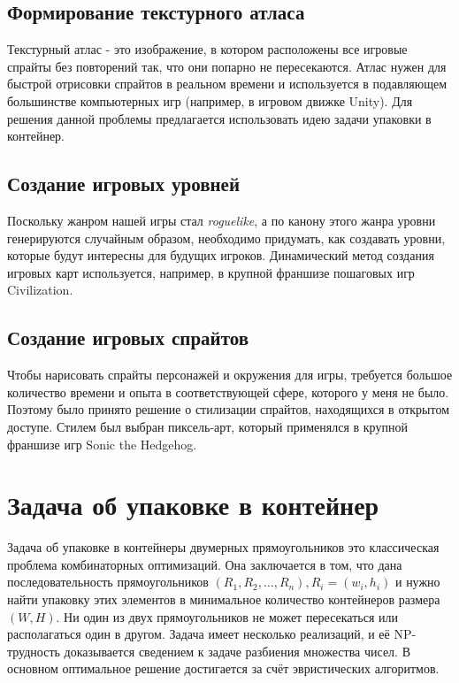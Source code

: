 \documentclass[a4paper,12pt]{report}
\theoremstyle{remark}
\begin{document}
\section{Формирование текстурного атласа}

Текстурный атлас - это изображение, в котором расположены все игровые спрайты без повторений так, что они попарно не пересекаются. Атлас нужен для быстрой отрисовки спрайтов в реальном времени и используется в подавляющем большинстве компьютерных игр (например, в игровом движке Unity\citep{unity}). Для решения данной проблемы предлагается использовать идею задачи упаковки в контейнер.

\section{Создание игровых уровней}

Поскольку жанром нашей игры стал \textit{roguelike}, а по канону этого жанра уровни генерируются случайным образом, необходимо придумать, как создавать уровни, которые будут интересны для будущих игроков. Динамический метод создания игровых карт используется, например, в крупной франшизе пошаговых игр Civilization\citep{civi}.

\section{Создание игровых спрайтов}

Чтобы нарисовать спрайты персонажей и окружения для игры, требуется большое количество времени и опыта в соответствующей сфере, которого у меня не было. Поэтому было принято решение о стилизации спрайтов, находящихся в открытом доступе. Стилем был выбран пиксель-арт, который применялся в крупной франшизе игр Sonic the Hedgehog\citep{sonic}.

\chapter{Задача об упаковке в контейнер} 

\parindent=1cm
Задача об упаковке в контейнеры\citep{Jylanki} двумерных прямоугольников это классическая проблема комбинаторных оптимизаций. Она заключается в том, что дана последовательность прямоугольников $(R_1, R_2, …, R_n), R_i = (w_i, h_i)$ и нужно найти упаковку этих элементов в минимальное количество контейнеров размера $(W, H)$. Ни один из двух прямоугольников не может пересекаться или располагаться один в другом. Задача имеет несколько реализаций, и её NP-трудность доказывается сведением к задаче разбиения множества чисел. В основном оптимальное решение достигается за счёт эвристических алгоритмов.
\end{document}
